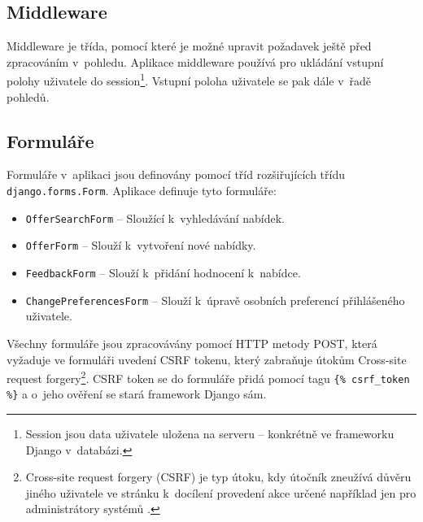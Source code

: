 \subsection{Middleware}
Middleware je třída, pomocí které je možné upravit požadavek ještě před zpracováním v~pohledu. Aplikace middleware používá pro ukládání vstupní polohy uživatele do session\footnote{Session jsou data uživatele uložena na serveru -- konkrétně ve frameworku Django v~databázi.}. Vstupní poloha uživatele se pak dále v~řadě pohledů.

\subsection{Formuláře}
\begin{sloppypar}
Formuláře v~aplikaci jsou definovány pomocí tříd rozšiřujících třídu \texttt{django.forms.Form}.
Aplikace definuje tyto formuláře:
\begin{itemize}
    \item \texttt{OfferSearchForm} -- Sloužící k~vyhledávání nabídek.
    \item \texttt{OfferForm} -- Slouží k~vytvoření nové nabídky.
    \item \texttt{FeedbackForm} -- Slouží k~přidání hodnocení k~nabídce.
    \item \texttt{ChangePreferencesForm} -- Slouží k~úpravě osobních preferencí přihlášeného uživatele.
\end{itemize}
Všechny formuláře jsou zpracovávány pomocí HTTP metody POST, která vyžaduje ve formuláři uvedení CSRF tokenu, který zabraňuje útokům Cross-site request forgery\footnote{Cross-site request forgery (CSRF) je typ útoku, kdy útočník zneužívá důvěru jiného uživatele ve stránku k~docílení provedení akce určené například jen pro administrátory systémů \cite{csrf}.}. CSRF token se do formuláře přidá pomocí tagu \mbox{\texttt{\{\% csrf\_token \%\}}} a o~jeho ověření se stará framework Django sám.
\end{sloppypar}